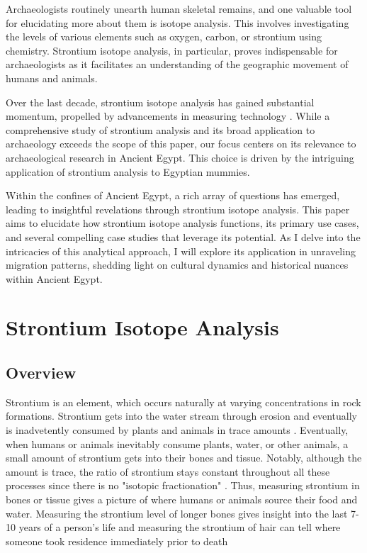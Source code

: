 \documentclass[a4paper, 12pt]{article}
\begin{document}
Archaeologists routinely unearth human skeletal remains, and one valuable tool for
elucidating more about them is isotope analysis. This involves investigating the
levels of various elements such as oxygen, carbon, or strontium using chemistry.
Strontium isotope analysis, in particular, proves indispensable for archaeologists
as it facilitates an understanding of the geographic movement of humans and animals.

Over the last decade, strontium isotope analysis has gained substantial momentum,
propelled by advancements in measuring technology \citep{holt2021}. While a
comprehensive study of strontium analysis and its broad application to archaeology
exceeds the scope of this paper, our focus centers on its relevance to archaeological
research in Ancient Egypt. This choice is driven by the intriguing application of
strontium analysis to Egyptian mummies.

Within the confines of Ancient Egypt, a rich array of questions has emerged, leading
to insightful revelations through strontium isotope analysis. This paper aims to
elucidate how strontium isotope analysis functions, its primary use cases, and several
compelling case studies that leverage its potential. As I delve into the intricacies
of this analytical approach, I will explore its application in unraveling migration
patterns, shedding light on cultural dynamics and historical nuances within Ancient
Egypt.

\section{Strontium Isotope Analysis}
\subsection{Overview}


Strontium is an element, which occurs naturally at varying concentrations in rock formations.
Strontium gets into the water stream through erosion and eventually is inadvetently consumed by plants and animals in trace amounts \citep{bartelink2019}.
Eventually, when humans or animals inevitably consume plants, water, or other animals,
a small amount of strontium gets into their bones and tissue. Notably, although the amount is trace, the
ratio of strontium stays constant throughout all these processes since there is no "isotopic fractionation" \citep{bartelink2019}.
Thus, measuring strontium in bones or tissue gives a picture of where humans or animals source their food and water.
Measuring the strontium level of longer bones gives insight into the last 7-10
years of a person's life and measuring the strontium of hair can tell where someone
took residence immediately prior to death \citep{kamenov2014}
\end{document}
